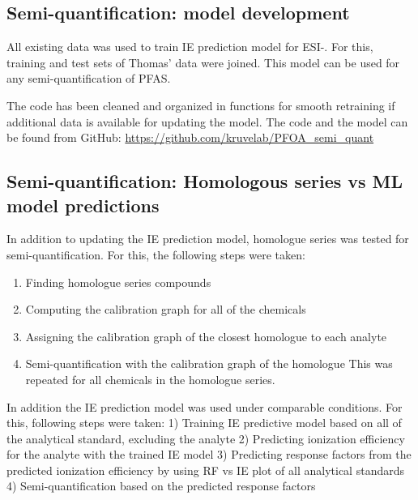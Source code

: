 \documentclass[
]{article}
\author{}
\date{\vspace{-2.5em}}
\providecommand{\tightlist}{%
  \setlength{\itemsep}{0pt}\setlength{\parskip}{0pt}}
\begin{document}
\hypertarget{semi-quantification-model-development}{%
\subsection{Semi-quantification: model
development}\label{semi-quantification-model-development}}

All existing data was used to train IE prediction model for ESI-. For
this, training and test sets of Thomas' data were joined. This model can
be used for any semi-quantification of PFAS.

The code has been cleaned and organized in functions for smooth
retraining if additional data is available for updating the model. The
code and the model can be found from GitHub:
\url{https://github.com/kruvelab/PFOA_semi_quant}

\hypertarget{semi-quantification-homologous-series-vs-ml-model-predictions}{%
\subsection{Semi-quantification: Homologous series vs ML model
predictions}\label{semi-quantification-homologous-series-vs-ml-model-predictions}}

In addition to updating the IE prediction model, homologue series was
tested for semi-quantification. For this, the following steps were
taken:

\begin{enumerate}
\def\labelenumi{\arabic{enumi})}
\tightlist
\item
  Finding homologue series compounds
\item
  Computing the calibration graph for all of the chemicals
\item
  Assigning the calibration graph of the closest homologue to each
  analyte
\item
  Semi-quantification with the calibration graph of the homologue This
  was repeated for all chemicals in the homologue series.
\end{enumerate}

In addition the IE prediction model was used under comparable
conditions. For this, following steps were taken: 1) Training IE
predictive model based on all of the analytical standard, excluding the
analyte 2) Predicting ionization efficiency for the analyte with the
trained IE model 3) Predicting response factors from the predicted
ionization efficiency by using RF vs IE plot of all analytical standards
4) Semi-quantification based on the predicted response factors
\end{document}
